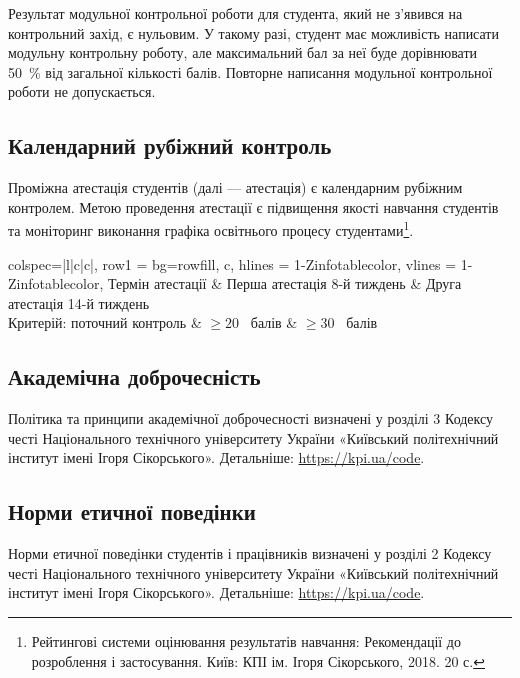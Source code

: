 \documentclass{Syllabus}
\begin{document}
Результат модульної контрольної роботи для студента, який не з’явився на контрольний захід, є нульовим. У такому разі, студент має можливість написати модульну контрольну роботу, але максимальний бал за неї буде дорівнювати 50~\% від загальної кількості балів. Повторне написання модульної контрольної роботи не допускається.

\subsection*{Календарний рубіжний контроль}

Проміжна атестація студентів (далі --- атестація) є календарним рубіжним контролем. Метою проведення атестації є підвищення якості навчання студентів та моніторинг виконання графіка освітнього процесу студентами\footnote{Рейтингові системи оцінювання результатів навчання: Рекомендації до розроблення і застосування. Київ: КПІ ім. Ігоря Сікорського, 2018. 20 с.}.

\begin{center}
	\begin{tblr}{
        colspec={|l|c|c|},
      	row{1} = {bg=rowfill, c},
      	hlines = {1-Z}{infotablecolor},
      	vlines = {1-Z}{infotablecolor},
    }
		Термін атестації                    & {Перша атестація 8-й тиждень}     & {Друга атестація 14-й тиждень}     \\
		{Критерій: поточний контроль} & $\ge 20$~ балів        & $\ge 30$~ балів \\
	\end{tblr}
\end{center}

\subsection*{Академічна доброчесність}

Політика та принципи академічної доброчесності визначені у розділі 3 Кодексу честі Національного технічного університету України «Київський політехнічний інститут імені Ігоря Сікорського». Детальніше: \url{https://kpi.ua/code}.

\subsection*{Норми етичної поведінки}

Норми етичної поведінки студентів і працівників визначені у розділі 2 Кодексу честі Національного технічного університету України «Київський політехнічний інститут імені Ігоря Сікорського». Детальніше: \url{https://kpi.ua/code}.
\end{document}
